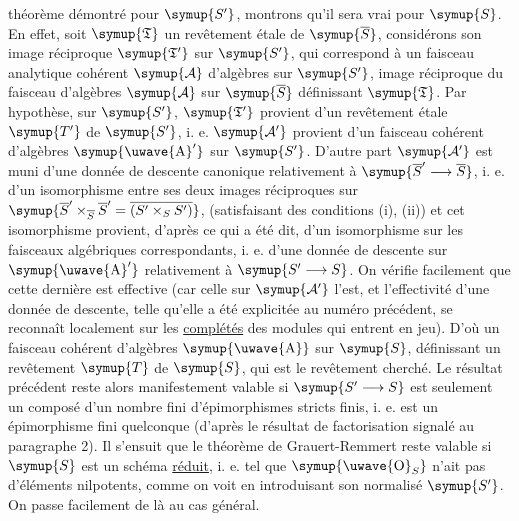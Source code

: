 théorème démontré pour $\symup{S'}$, montrons qu'il sera vrai pour $\symup{S}$. En effet, soit
$\symup{\mathfrak T}$ un revêtement étale de $\symup{\overline S}$, considérons son image
réciproque $\symup{\mathfrak T'}$ sur $\symup{S'}$, qui correspond à un faisceau
analytique cohérent $\symup{\mathcal A}$ d'algèbres sur $\symup{S'}$, image
réciproque du faisceau d'algèbres $\symup{\mathcal A}$ sur $\symup{\overline S}$ définissant
$\symup{\mathfrak T}$. Par hypothèse, sur $\symup{S'}$, $\symup{\mathfrak T'}$ provient d'un
revêtement étale $\symup{T'}$ de $\symup{S'}$, i. e. $\symup{\mathcal A'}$ provient d'un faisceau
cohérent d'algèbres $\symup{\text{\uwave{A}}'}$ sur $\symup{S'}$. D'autre part $\symup{\mathcal A'}$ est muni d'une
donnée de descente canonique relativement à
$\symup{\overline S'\longrightarrow\overline S}$, i. e. d'un isomorphisme entre ses
deux images réciproques sur $\symup{\overline S'\times_{\overline S}\overline S'=\overline{(S'\times_SS')}}$, (satisfaisant des conditions (i), (ii)) et cet isomorphisme provient, d'après
ce qui a été dit, d'un isomorphisme sur les faisceaux algébriques
correspondants, i. e. d'une donnée de descente sur $\symup{\text{\uwave{A}}'}$ relativement à
$\symup{S'\longrightarrow S}$. On vérifie facilement que cette dernière est effective
(car celle sur $\symup{\mathcal A'}$ l'est, et l'effectivité d'une donnée de descente,
telle qu'elle a été explicitée au numéro précédent, se reconnaît localement sur
les \uline{complétés} des modules qui entrent en jeu). D'où un faisceau cohérent
d'algèbres $\symup{\text{\uwave{A}}}$ sur $\symup{S}$, définissant un revêtement $\symup{T}$ de $\symup{S}$, qui est le
revêtement cherché. Le résultat précédent reste alors manifestement valable si
$\symup{S'\longrightarrow S}$ est seulement un composé d'un nombre fini
d'épimorphismes stricts finis, i. e. est un épimorphisme fini quelconque (d'après
le résultat de factorisation signalé au paragraphe 2). Il s'ensuit que le
théorème de Grauert-Remmert reste valable si $\symup{S}$ est un schéma \uline{réduit},
i. e. tel que $\symup{\text{\uwave{O}}_S}$ n'ait pas d'éléments nilpotents, comme on voit en
introduisant son normalisé $\symup{S'}$. On passe facilement de là au cas général.

